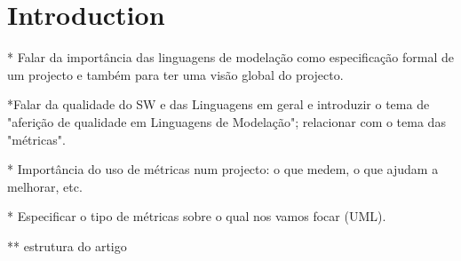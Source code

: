 \section{Introduction}

    * Falar da importância das linguagens de modelação como especificação formal de um projecto e também para ter uma visão global do projecto.

    *Falar da qualidade do SW e das Linguagens em geral e introduzir o tema de "aferição de qualidade em Linguagens de Modelação"; relacionar com o tema das "métricas".

    * Importância do uso de métricas num projecto: o que medem, o que ajudam a melhorar, etc.

    * Especificar o tipo de métricas sobre o qual nos vamos focar (UML).

    ** estrutura do artigo